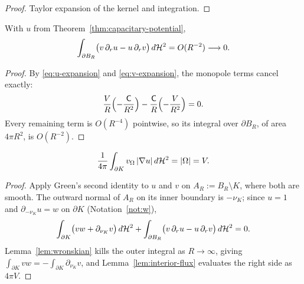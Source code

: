 \begin{proof}
Taylor expansion of the kernel and integration.
\end{proof}

\begin{lemma}\label{lem:wronskian}
With $u$ from Theorem~\ref{thm:capacitary-potential},
\begin{equation}\label{eq:wronskian}
  \int_{\partial B_R}\bigl(v\,\partial_ru-u\,\partial_rv\bigr)\,d\mathcal H^2
  =O(R^{-2})\longrightarrow0 .
\end{equation}
\end{lemma}

\begin{proof}
By \eqref{eq:u-expansion} and \eqref{eq:v-expansion}, the monopole terms
cancel exactly:
\[
  \frac VR\Bigl(-\frac{\mathsf C}{R^2}\Bigr)
  -\frac{\mathsf C}{R}\Bigl(-\frac V{R^2}\Bigr)=0 .
\]
Every remaining term is $O(R^{-4})$ pointwise, so its integral over
$\partial B_R$, of area $4\pi R^2$, is $O(R^{-2})$.
\end{proof}

\begin{theorem}\label{thm:green-identity}
\begin{equation}\label{eq:green-identity}
  \frac1{4\pi}\int_{\partial K}v_\Omega\,|\nabla u|\,d\mathcal H^2=|\Omega|=V .
\end{equation}
\end{theorem}

\begin{proof}
Apply Green's second identity to $u$ and $v$ on $A_R:=B_R\setminus K$, where
both are smooth.  The outward normal of $A_R$ on its inner boundary is
$-\nu_K$; since $u=1$ and $\partial_{-\nu_K}u=w$ on $\partial K$
(Notation~\ref{not:w}),
\begin{equation}\label{eq:green-second}
  \int_{\partial K}\bigl(vw+\partial_{\nu_K}v\bigr)\,d\mathcal H^2
  +\int_{\partial B_R}\bigl(v\,\partial_ru-u\,\partial_rv\bigr)\,d\mathcal H^2=0 .
\end{equation}
Lemma~\ref{lem:wronskian} kills the outer integral as $R\to\infty$, giving
$\int_{\partial K}vw=-\int_{\partial K}\partial_{\nu_K}v$, and
Lemma~\ref{lem:interior-flux} evaluates the right side as $4\pi V$.
\end{proof}

